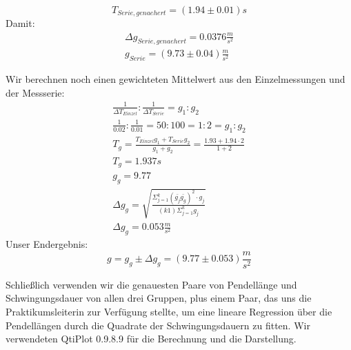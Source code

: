 \documentclass{article}
\begin{document}
\begin{equation}
T_{Serie,genaehert} = (1.94 \pm 0.01)s
\end{equation}
Damit:
\begin{gather}
\Delta g_{Serie,genaehert} = 0.0376 \frac{m}{s^2} \\
 g_{Serie} = (9.73\pm0.04)\frac{m}{s^2}
\end{gather}

Wir berechnen noch einen gewichteten Mittelwert aus den Einzelmessungen und der Messserie:
 \begin{gather}
 \frac{1}{\Delta T_{Einzel}}:\frac{1}{\Delta T_{Serie}}=g_1:g_2 \\
 \frac{1}{0.02}:\frac{1}{0.01}=50:100=1:2=g_1:g_2 \\
 T_g=\frac{T_{Einzel}g_1+T_{Serie}g_2}{g_1+g_2}=\frac{1.93+1.94\cdot2}{1+2} \\
 T_g=1.937s \\
 g_g=9.77 \\
 \Delta g_g= \sqrt{\frac{\Sigma^k_{j=1}( \bar{g_j} \bar{g_g} )^2 \cdot g_j}{(k1)\Sigma^k_{j=1}g_j} } \\
 \Delta g_g=0.053 \frac{m}{s^2}
 \end{gather}
 Unser Endergebnis:
 \begin{equation}
 g=g_g\pm \Delta g_g = (9.77 \pm 0.053)\frac{m}{s^2}
 \end{equation}

Schließlich verwenden wir die genauesten Paare von Pendellänge und Schwingungsdauer von allen drei Gruppen, plus einem Paar, das uns die Praktikumsleiterin zur Verfügung stellte, um eine lineare Regression über die Pendellängen durch die Quadrate der Schwingungsdauern zu fitten. Wir verwendeten QtiPlot 0.9.8.9 für die Berechnung und die Darstellung. \\
\end{document}
